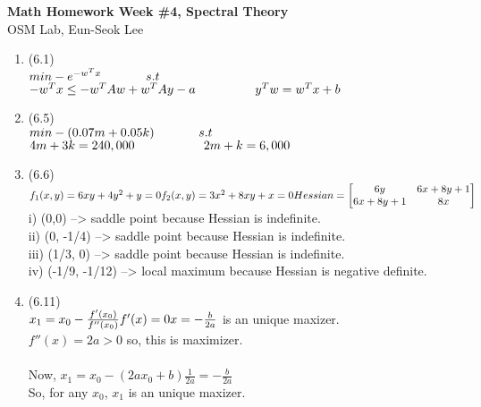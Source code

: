 \documentclass[letterpaper,12pt]{article}
\theoremstyle{definition}
\begin{document}
\begin{flushleft}
   \textbf{\large{Math Homework Week \#4, Spectral Theory}} \\[5pt]
   OSM Lab, Eun-Seok Lee \\[5pt]

\end{flushleft}

\vspace{5mm}

\begin{enumerate}



	\item (6.1) \\
$min -e^{-w^Tx} \\
\phantom{----}s.t$ $-w^Tx \leq - w^TAw + w^TAy - a\\
\phantom{-----}y^Tw = w^Tx +b$


	\item (6.5) \\
$min -(0.07m + 0.05k) \\
\phantom{----}s.t$ $4m + 3k = 240,000\\
\phantom{------}2m + k = 6,000$

	\item (6.6) \\
$f_1(x,y) = 6xy + 4y^2 + y = 0\\
f_2(x, y) = 3x^2 + 8xy + x = 0\\  \\
Hessian =  \begin{bmatrix} 6y& 6x+8y+1 \\ 6x+8y+1& 8x \end{bmatrix}\\$
i) (0,0) --> saddle point because Hessian is indefinite.\\
ii) (0, -1/4) --> saddle point because Hessian is indefinite.\\
iii) (1/3, 0) --> saddle point because Hessian is indefinite.\\
iv) (-1/9, -1/12) --> local maximum because Hessian is negative definite.\\


	\item (6.11) \\
$ x_1 = x_0 - \frac{f'(x_0)}{f''(x_0)}\\
f'(x) = 0\\
x = -\frac{b}{2a} $ is an unique maxizer. \\
$f''(x) = 2a > 0$ so, this is maximizer. \\
\\
Now, $x_1 = x_0 - (2ax_0 +b)\frac{1}{2a} = -\frac{b}{2a}$ \\
So, for any $x_0$, $x_1$ is an unique maxizer.
 



\end{enumerate}
\end{document}
